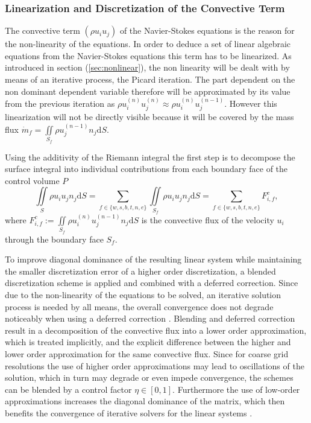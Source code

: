 \subsubsection{Linearization and Discretization of the Convective Term}
\label{sec:segconvective}

The convective term \(\left( \rho u_i u_j \right)\) of the Navier-Stokes equations is the reason for the non-linearity of the equations. In order to deduce a set of linear algebraic equations from the Navier-Stokes equations this term has to be linearized. As introduced in section (\ref{sec:nonlinear}), the non linearity will be dealt with by means of an iterative process, the Picard iteration. The part dependent on the non dominant dependent variable therefore will be approximated by its value from the previous iteration as \( \rho u_i^{(n)} u_j^{(n)} \approx \rho u_i^{(n)} u_j^{(n-1)} \). However this linearization will not be directly visible because it will be covered by the mass flux \(\textstyle \dot{m}_f = \iint\limits_{S_f} \rho u_j^{(n-1)} n_j \mathrm{d}S \). 

Using the additivity of the Riemann integral the first step is to decompose the surface integral into individual contributions from each boundary face of the control volume \(P\)
\begin{displaymath}
  \iint\limits_S \rho u_i u_jn_j \mathrm{d}S
  = \sum_{f \in \{w,s,b,t,n,e\}} \iint\limits_{S_f}\rho u_{i} u_{j} n_{j} \mathrm{d}S
  = \sum_{f \in \{w,s,b,t,n,e\}} F_{i,f}^{c},
\end{displaymath}
where \(\textstyle F_{i,f}^c := \iint\limits_{S_f} \rho u_{i}^{(n)} u_{j}^{(n-1)} n_{j} \mathrm{d}S \) is the convective flux of the velocity \(u_i\) through the boundary face \(S_f\). 
      
To improve diagonal dominance of the resulting linear system while maintaining the smaller discretization error of a higher order discretization, a blended discretization scheme is applied and combined with a deferred correction. Since due to the non-linearity of the equations to be solved, an iterative solution process is needed by all means, the overall convergence does not degrade noticeably when using a deferred correction \cite{ferziger02}. Blending and deferred correction result in a decomposition of the convective flux into a lower order approximation, which is treated implicitly, and the explicit difference between the higher and lower order approximation for the same convective flux. Since for coarse grid resolutions the use of higher order approximations may lead to oscillations of the solution, which in turn may degrade or even impede convergence, the schemes can be blended by a control factor \( \eta \in [0,1]\). Furthermore the use of low-order approximations increases the diagonal dominance of the matrix, which then benefits the convergence of iterative solvers for the linear systems \cite{schaefer99}.

